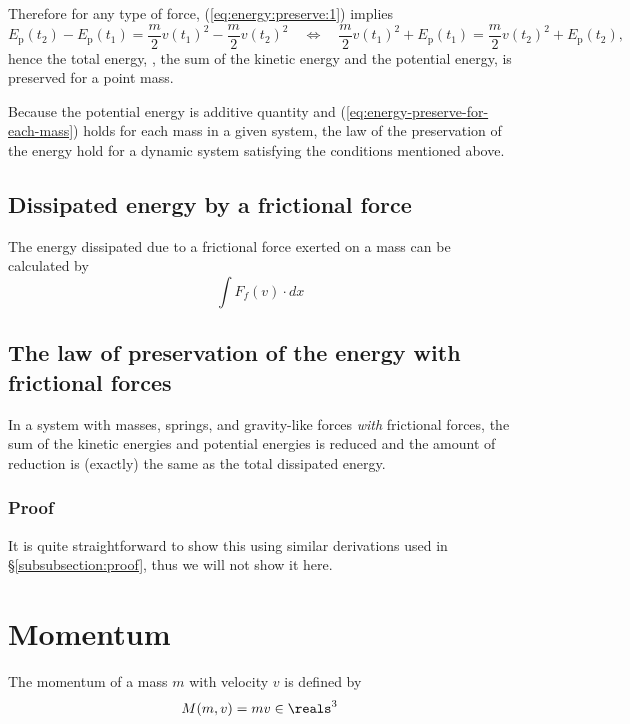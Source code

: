 \documentclass{article}
\begin{document}
Therefore for any type of force,
(\ref{eq:energy:preserve:1})
implies
\begin{equation}
\label{eq:energy-preserve-for-each-mass}
E_\mathrm{p}(t_2) - E_\mathrm{p}(t_1)
=
\frac{m}{2} v(t_1)^2
- \frac{m}{2}v(t_2)^2
\quad
\Leftrightarrow
\quad
\frac{m}{2} v(t_1)^2 + E_\mathrm{p}(t_1)
=
\frac{m}{2} v(t_2)^2 + E_\mathrm{p}(t_2),
\end{equation}
hence the total energy,
\ie,
the sum of the kinetic energy and the potential energy,
is preserved for a point mass.

Because the potential energy is additive quantity
and (\ref{eq:energy-preserve-for-each-mass})
holds for each mass in a given system,
the law of the preservation of the energy hold
for a dynamic system satisfying the conditions mentioned above.


\subsection{Dissipated energy by a frictional force}

The energy dissipated due to a frictional force exerted on a mass
can be calculated by
\begin{equation}
\int F_f(v) \cdot dx
\end{equation}

\subsection{The law of preservation of the energy with frictional forces}

In a system with masses, springs, and gravity-like forces \emph{with} frictional forces,
the sum of the kinetic energies and potential energies is reduced
and the amount of reduction is (exactly) the same as the total dissipated energy.

\subsubsection{Proof}

It is quite straightforward to show this using similar derivations
used in \S\ref{subsubsection:proof},
thus we will not show it here.


\section{Momentum}

The momentum of a mass $m$ with velocity $v$ is defined by
\begin{equation}
M(m,v) = mv \in\reals^3
\end{equation}
\end{document}
